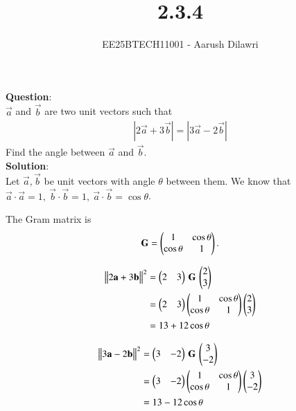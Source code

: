 \documentclass[journal]{IEEEtran}
\begin{document}

\vspace{3cm}

\title{2.3.4}
\author{EE25BTECH11001 - Aarush Dilawri}
{\let\newpage\relax\maketitle}

\renewcommand{\thefigure}{\theenumi}
\renewcommand{\thetable}{\theenumi}
\setlength{\intextsep}{10pt} %
\textbf{Question}:\\
$\vec{a}$ and $\vec{b}$ are two unit vectors such that\\
\begin{align}
    \left| 2\vec{a} + 3\vec{b} \right| = \left| 3\vec{a} - 2\vec{b} \right|
\end{align}
Find the angle between $\vec{a}$ and $\vec{b}$.\\
\textbf{Solution}:\\
Let $\vec{a}, \vec{b}$ be unit vectors with angle $\theta$ between them.  
We know that $\vec{a}\cdot\vec{a} = 1,\ \vec{b}\cdot\vec{b} = 1,\ \vec{a}\cdot\vec{b} = \cos\theta$.

The Gram matrix is
\begin{align*}
\mathbf{G} =
\begin{pmatrix}
1 & \cos\theta \\
\cos\theta & 1
\end{pmatrix}.
\end{align*}

\begin{align}
\big\lVert 2\mathbf{a} + 3\mathbf{b} \big\rVert^2 
&= \begin{pmatrix}2 & 3\end{pmatrix} \, \mathbf{G} \, \begin{pmatrix}2 \\ 3\end{pmatrix} \\
&= \begin{pmatrix}2 & 3\end{pmatrix}
\begin{pmatrix}
1 & \cos\theta \\
\cos\theta & 1
\end{pmatrix}
\begin{pmatrix}2 \\ 3\end{pmatrix} \\
&= 13 + 12\cos\theta
\end{align}

\begin{align}
\big\lVert 3\mathbf{a} - 2\mathbf{b} \big\rVert^2 
&= \begin{pmatrix}3 & -2\end{pmatrix} \, \mathbf{G} \, \begin{pmatrix}3 \\ -2\end{pmatrix} \\
&= \begin{pmatrix}3 & -2\end{pmatrix}
\begin{pmatrix}
1 & \cos\theta \\
\cos\theta & 1
\end{pmatrix}
\begin{pmatrix}3 \\ -2\end{pmatrix} \\
&= 13 - 12\cos\theta
\end{align}
\end{document}

